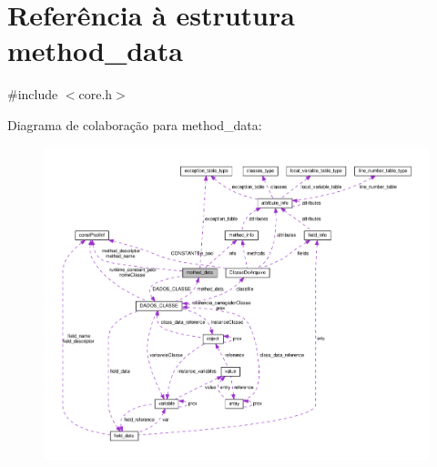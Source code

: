 \hypertarget{structmethod__data}{\section{Referência à estrutura method\-\_\-data}
\label{structmethod__data}
}


{\ttfamily \#include $<$core.\-h$>$}



Diagrama de colaboração para method\-\_\-data\-:\nopagebreak
\begin{figure}[H]
\begin{center}
\leavevmode
\includegraphics[width=350pt]{structmethod__data__coll__graph}
\end{center}
\end{figure}
